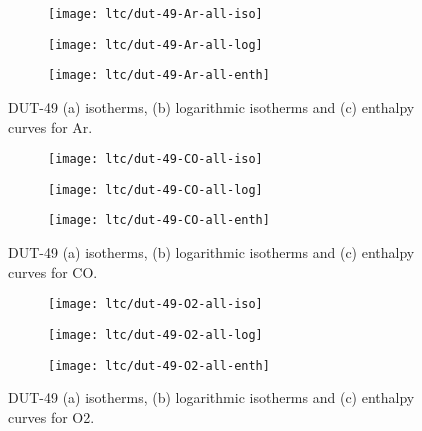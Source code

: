 \begin{figure}[htb]
    \centering
    \begin{subfigure}{0.33\linewidth}
        \texttt{[image: ltc/dut-49-Ar-all-iso]}%
        \caption{}
    \end{subfigure}%
    \begin{subfigure}{0.33\linewidth}
        \texttt{[image: ltc/dut-49-Ar-all-log]}%
        \caption{}
    \end{subfigure}%
    \begin{subfigure}{0.33\linewidth}
        \texttt{[image: ltc/dut-49-Ar-all-enth]}%
        \caption{}
    \end{subfigure}%
    \caption{DUT-49 (a) isotherms, (b) logarithmic isotherms and 
    (c) enthalpy curves for Ar.}%
    \label{appx:dut:fig:dut-49-Ar-ltc}
\end{figure}

\begin{figure}[htb]
    \centering
    \begin{subfigure}{0.33\linewidth}
        \texttt{[image: ltc/dut-49-CO-all-iso]}%
        \caption{}
    \end{subfigure}%
    \begin{subfigure}{0.33\linewidth}
        \texttt{[image: ltc/dut-49-CO-all-log]}%
        \caption{}
    \end{subfigure}%
    \begin{subfigure}{0.33\linewidth}
        \texttt{[image: ltc/dut-49-CO-all-enth]}%
        \caption{}
    \end{subfigure}%
    \caption{DUT-49 (a) isotherms, (b) logarithmic isotherms and 
    (c) enthalpy curves for CO.}%
    \label{appx:dut:fig:dut-49-CO-ltc}
\end{figure}

\begin{figure}[htb]
    \centering
    \begin{subfigure}{0.33\linewidth}
        \texttt{[image: ltc/dut-49-O2-all-iso]}%
        \caption{}
    \end{subfigure}%
    \begin{subfigure}{0.33\linewidth}
        \texttt{[image: ltc/dut-49-O2-all-log]}%
        \caption{}
    \end{subfigure}%
    \begin{subfigure}{0.33\linewidth}
        \texttt{[image: ltc/dut-49-O2-all-enth]}%
        \caption{}
    \end{subfigure}%
    \caption{DUT-49 (a) isotherms, (b) logarithmic isotherms and 
    (c) enthalpy curves for O2.}%
    \label{appx:dut:fig:dut-49-O2-ltc}
\end{figure}


